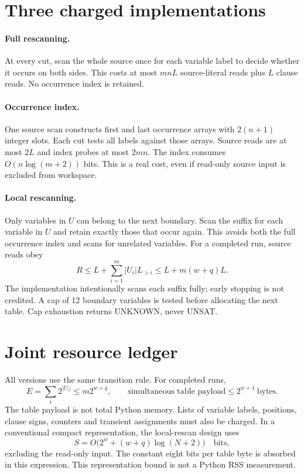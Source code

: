 \documentclass[11pt]{article}
\begin{document}
\section{Three charged implementations}
\paragraph{Full rescanning.}
At every cut, scan the whole source once for each variable label to decide
whether it occurs on both sides. This costs at most $mnL$ source-literal reads
plus $L$ clause reads. No occurrence index is retained.

\paragraph{Occurrence index.}
One source scan constructs first and last occurrence arrays with $2(n+1)$
integer slots. Each cut tests all labels against those arrays. Source reads are
at most $2L$ and index probes at most $2mn$. The index consumes
$O(n\log(m+2))$ bits. This is a real cost, even if read-only source input is
excluded from workspace.

\paragraph{Local rescanning.}
Only variables in $U$ can belong to the next boundary. Scan the suffix for
each variable in $U$ and retain exactly those that occur again. This avoids
both the full occurrence index and scans for unrelated variables.
For a completed run, source reads obey
\[
 R\le L+\sum_{i=1}^m |U_i|L_{>i}
 \le L+m(w+q)L.
\]
The implementation intentionally scans each suffix fully; early stopping is
not credited. A cap of 12 boundary variables is tested before allocating
the next table. Cap exhaustion returns UNKNOWN, never UNSAT.

\section{Joint resource ledger}
All versions use the same transition rule. For completed runs,
\[
 E=\sum_i2^{|U_i|}\le m2^{w+q},\qquad
 \text{simultaneous table payload}\le 2^{w+1}\ \text{bytes}.
\]
The table payload is not total Python memory. Lists of variable labels,
positions, clause signs, counters and transient assignments must also be
charged. In a conventional compact representation, the local-rescan design
uses
\[
 S=O\bigl(2^w+(w+q)\log(N+2)\bigr)\quad\text{bits},
\]
excluding the read-only input. The constant eight bits per table byte is
absorbed in this expression. This representation bound is not a Python RSS
measurement.
\end{document}
